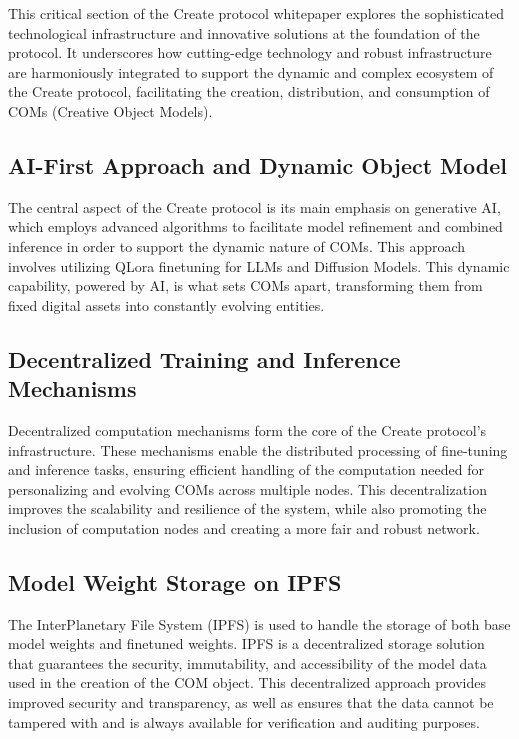 \documentclass[12pt,a4paper]{article}
\begin{document}
This critical section of the Create protocol whitepaper explores the sophisticated technological infrastructure and innovative solutions at the foundation of the protocol. It underscores how cutting-edge technology and robust infrastructure are harmoniously integrated to support the dynamic and complex ecosystem of the Create protocol, facilitating the creation, distribution, and consumption of COMs (Creative Object Models).

\subsection{AI-First Approach and Dynamic Object Model}

The central aspect of the Create protocol is its main emphasis on generative AI, which employs advanced algorithms to facilitate model refinement and combined inference in order to support the dynamic nature of COMs. This approach involves utilizing QLora finetuning for LLMs and Diffusion Models. This dynamic capability, powered by AI, is what sets COMs apart, transforming them from fixed digital assets into constantly evolving entities.

\subsection{Decentralized Training and Inference Mechanisms}

Decentralized computation mechanisms form the core of the Create protocol's infrastructure. These mechanisms enable the distributed processing of fine-tuning and inference tasks, ensuring efficient handling of the computation needed for personalizing and evolving COMs across multiple nodes. This decentralization improves the scalability and resilience of the system, while also promoting the inclusion of computation nodes and creating a more fair and robust network.


\subsection{Model Weight Storage on IPFS}

The InterPlanetary File System (IPFS) is used to handle the storage of both base model weights and finetuned weights. IPFS is a decentralized storage solution that guarantees the security, immutability, and accessibility of the model data used in the creation of the COM object. This decentralized approach provides improved security and transparency, as well as ensures that the data cannot be tampered with and is always available for verification and auditing purposes.
\end{document}
